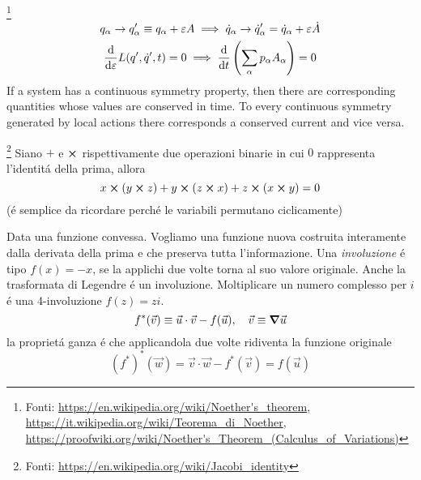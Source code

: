 \begin{multicols}{3}

  \footnote{
    \tiny Fonti:
    \url{https://en.wikipedia.org/wiki/Noether's_theorem},
    \url{https://it.wikipedia.org/wiki/Teorema_di_Noether},
    \url{https://proofwiki.org/wiki/Noether's_Theorem_(Calculus_of_Variations)}
  }
  \begin{equation}
    \label{th:noether}
    \begin{gathered}
      q_{\alpha} \to q'_{\alpha}
      \equiv q_{\alpha} + \varepsilon{A}
      \implies
      \dot{q}_{\alpha} \to \dot{q}'_{\alpha}
      = \dot{q}_{\alpha} + \varepsilon\dot{A} \\
      \dv{\varepsilon}
      L(q', \dot{q}', t) = 0
      \implies
      \dv{t}\left(\sum_\alpha p_{\alpha}A_{\alpha}\right) = 0
    \end{gathered}
  \end{equation}
  If a system has a continuous symmetry property, then there are corresponding
  quantities whose values are conserved in time.
  To every continuous symmetry generated by local actions there corresponds a
  conserved current and vice versa.

  \footnote{
    \tiny Fonti:
    \url{https://en.wikipedia.org/wiki/Jacobi_identity}
  }
  Siano $+$ e $\cross$ rispettivamente due operazioni binarie in cui $0$
  rappresenta l'identit\'a della prima, allora
  \begin{equation}
    \label{th:id-jacobi}
    x \cross (y \cross z) + y \cross (z \cross x) + z \cross (x \cross y) = 0
  \end{equation}
  (\'e semplice da ricordare perch\'e le variabili permutano ciclicamente)

  Data una funzione convessa.
  Vogliamo una funzione nuova costruita interamente dalla derivata della prima
  e che preserva tutta l'informazione.
  Una \textit{involuzione} \'e tipo $f(x) = -x$, se la applichi due volte torna
  al suo valore originale. Anche la trasformata di Legendre \'e un involuzione.
  Moltiplicare un numero complesso per $i$ \'e una 4-involuzione $f(z) = zi$.
  \begin{equation}
    \label{th:transform-legendre}
    f^*(\vec{v}) \equiv \vec{u}\cdot\vec{v} - f(\vec{u}),
    \quad \vec{v} \equiv \grad{\vec{u}}
  \end{equation}
  la propriet\'a ganza \'e che applicandola due volte ridiventa la funzione originale
  \begin{equation*}
    (f^*)^*(\vec{w}) = \vec{v}\cdot\vec{w} - f^*(\vec{v}) = f(\vec{u})
  \end{equation*}


\end{multicols}
